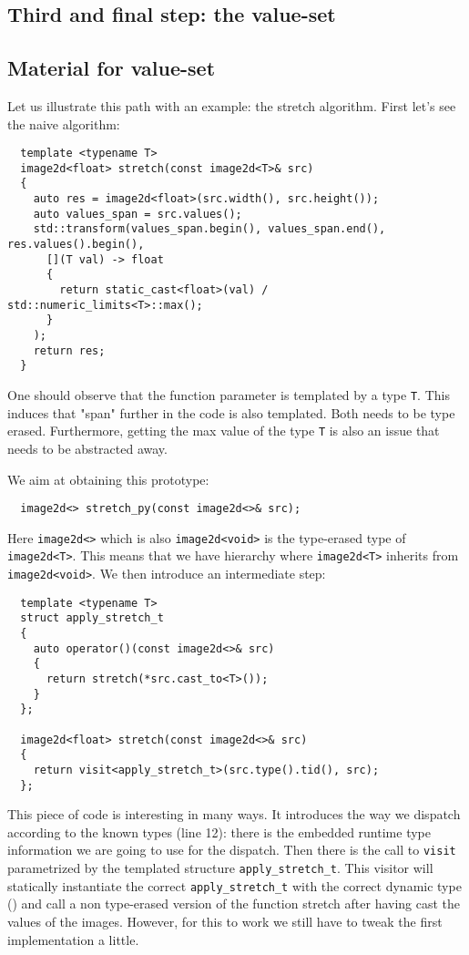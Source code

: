 \subsection{Third and final step: the value-set}


\subsection*{Material for value-set}


Let us illustrate this path with an example: the stretch algorithm. First let's see the naive algorithm:
\begin{verbatim}
  template <typename T>
  image2d<float> stretch(const image2d<T>& src)
  {
    auto res = image2d<float>(src.width(), src.height());
    auto values_span = src.values();
    std::transform(values_span.begin(), values_span.end(), res.values().begin(),
      [](T val) -> float
      {
        return static_cast<float>(val) / std::numeric_limits<T>::max();
      }
    );
    return res;
  }
\end{verbatim}

One should observe that the function parameter is templated by a type \texttt{T}. This induces that "span" further in
the code is also templated. Both needs to be type erased. Furthermore, getting the max value of the type \texttt{T} is
also an issue that needs to be abstracted away.

We aim at obtaining this prototype:

\begin{verbatim}
  image2d<> stretch_py(const image2d<>& src);
\end{verbatim}

Here \texttt{image2d<>} which is also \texttt{image2d<void>} is the type-erased type of \texttt{image2d<T>}. This means
that we have hierarchy where \texttt{image2d<T>} inherits from \texttt{image2d<void>}. We then introduce an intermediate
step:

\begin{verbatim}
  template <typename T>
  struct apply_stretch_t
  {
    auto operator()(const image2d<>& src)
    {
      return stretch(*src.cast_to<T>());
    }
  };

  image2d<float> stretch(const image2d<>& src)
  {
    return visit<apply_stretch_t>(src.type().tid(), src);
  };
\end{verbatim}

This piece of code is interesting in many ways. It introduces the way we dispatch according to the known types (line
12): there is the embedded runtime type information we are going to use for the dispatch. Then there is the call to
\texttt{visit} parametrized by the templated structure \texttt{apply\_stretch\_t}. This visitor will statically
instantiate the correct \texttt{apply\_stretch\_t} with the correct dynamic type () and call a
non type-erased version of the function stretch after having cast the values of the images. However, for this to work we
still have to tweak the first implementation a little.

